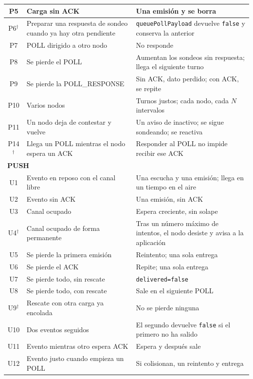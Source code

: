{\begin{longtable}{|c|p{6.4cm}|p{6.8cm}|}
\hline
P5 & Carga sin ACK & Una emisión y se borra \\
\hline
P6$^{\dagger}$ & Preparar una respuesta de sondeo cuando ya hay otra pendiente & \texttt{queuePollPayload} devuelve \texttt{false} y conserva la anterior \\
\hline
P7 & POLL dirigido a otro nodo & No responde \\
\hline
P8 & Se pierde el POLL & Aumentan los sondeos sin respuesta; llega el siguiente turno \\
\hline
P9 & Se pierde la POLL\_RESPONSE & Sin ACK, dato perdido; con ACK, se repite \\
\hline
P10 & Varios nodos & Turnos justos; cada nodo, cada $N$ intervalos \\
\hline
P11 & Un nodo deja de contestar y vuelve & Un aviso de inactivo; se sigue sondeando; se reactiva \\
\hline
P14$^{\dagger}$ & Llega un POLL mientras el nodo espera un ACK & Responder al POLL no impide recibir ese ACK \\
\hline
\multicolumn{3}{|l|}{\textbf{PUSH}} \\
\hline
U1 & Evento en reposo con el canal libre & Una escucha y una emisión; llega en un tiempo en el aire \\
\hline
U2 & Evento sin ACK & Una emisión, sin ACK \\
\hline
U3 & Canal ocupado & Espera creciente, sin solape \\
\hline
U4$^{\dagger}$ & Canal ocupado de forma permanente & Tras un número máximo de intentos, el nodo desiste y avisa a la aplicación \\
\hline
U5 & Se pierde la primera emisión & Reintento; una sola entrega \\
\hline
U6 & Se pierde el ACK & Repite; una sola entrega \\
\hline
U7 & Se pierde todo, sin rescate & \texttt{delivered=false} \\
\hline
U8 & Se pierde todo, con rescate & Sale en el siguiente POLL \\
\hline
U9$^{\dagger}$ & Rescate con otra carga ya encolada & No se pierde ninguna \\
\hline
U10 & Dos eventos seguidos & El segundo devuelve \texttt{false} si el primero no ha salido \\
\hline
U11 & Evento mientras otro espera ACK & Espera y después sale \\
\hline
U12 & Evento justo cuando empieza un POLL & Si colisionan, un reintento y entrega \\

\end{longtable}}
